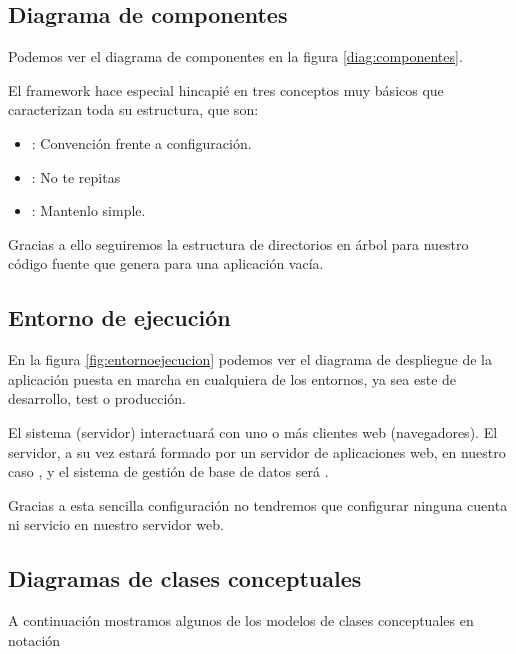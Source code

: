 \subsection{Diagrama de componentes}
Podemos ver el diagrama de componentes en la figura \ref{diag:componentes}.


El framework  hace especial hincapié en tres conceptos
muy básicos que caracterizan toda su estructura, que son:

\begin{itemize}
\item {}: Convención frente a
  configuración.
\item {}: No te repitas
\item {}: Mantenlo simple.
\end{itemize}

Gracias a ello seguiremos la estructura de directorios en árbol para nuestro
código fuente que genera  para una aplicación vacía.
\subsection{Entorno de ejecución}
En la figura \ref{fig:entornoejecucion} podemos ver el diagrama de despliegue de
la aplicación puesta en marcha en cualquiera de los entornos, ya sea este de
desarrollo, test o producción.


El sistema (servidor) interactuará con uno o más clientes web (navegadores). El
servidor, a su vez estará formado por un servidor de aplicaciones web, en
nuestro caso , y el sistema de gestión de base de datos será
.

Gracias a esta sencilla configuración no tendremos que configurar ninguna cuenta
ni servicio en nuestro servidor web.
\subsection{Diagramas de clases conceptuales}
A continuación mostramos algunos de los modelos de clases conceptuales en
notación  \cite{uml:distilled_standard}

\clearpage

